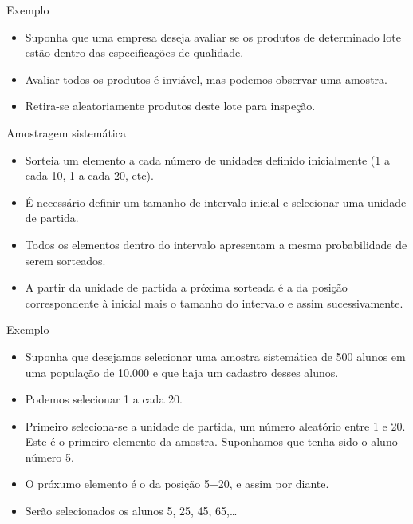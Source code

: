 \documentclass[
  ignorenonframetext,
  serif,
  professionalfont,
  usenames,
  dvipsnames,
  aspectratio = 169]{beamer}
\begin{document}
\begin{frame}{Exemplo}
\protect\hypertarget{exemplo}{}
\begin{itemize}
\item
  Suponha que uma empresa deseja avaliar se os produtos de determinado
  lote estão dentro das especificações de qualidade.
\item
  Avaliar todos os produtos é inviável, mas podemos observar uma
  amostra.
\item
  Retira-se aleatoriamente produtos deste lote para inspeção.
\end{itemize}
\end{frame}

\begin{frame}{Amostragem sistemática}
\protect\hypertarget{amostragem-sistemuxe1tica}{}
\begin{itemize}
\item
  Sorteia um elemento a cada número de unidades definido inicialmente (1
  a cada 10, 1 a cada 20, etc).
\item
  É necessário definir um tamanho de intervalo inicial e selecionar uma
  unidade de partida.
\item
  Todos os elementos dentro do intervalo apresentam a mesma
  probabilidade de serem sorteados.
\item
  A partir da unidade de partida a próxima sorteada é a da posição
  correspondente à inicial mais o tamanho do intervalo e assim
  sucessivamente.
\end{itemize}
\end{frame}

\begin{frame}{Exemplo}
\protect\hypertarget{exemplo-1}{}
\begin{itemize}
\item
  Suponha que desejamos selecionar uma amostra sistemática de 500 alunos
  em uma população de 10.000 e que haja um cadastro desses alunos.
\item
  Podemos selecionar 1 a cada 20.
\item
  Primeiro seleciona-se a unidade de partida, um número aleatório entre
  1 e 20. Este é o primeiro elemento da amostra. Suponhamos que tenha
  sido o aluno número 5.
\item
  O próxumo elemento é o da posição 5+20, e assim por diante.
\item
  Serão selecionados os alunos 5, 25, 45, 65,\ldots{}
\end{itemize}
\end{frame}
\end{document}
